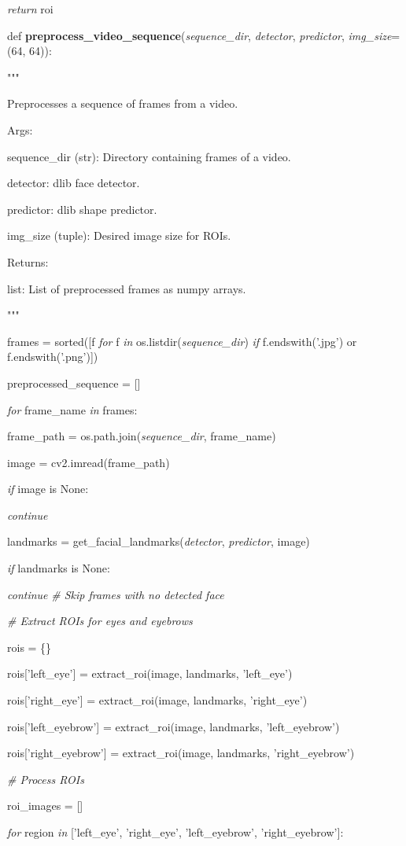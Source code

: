 \documentclass[
]{article}
\begin{document}
\emph{return} roi

def \textbf{preprocess\_video\_sequence}(\emph{sequence\_dir}, \emph{detector}, \emph{predictor}, \emph{img\_size}=(64, 64)):

"""

Preprocesses a sequence of frames from a video.

Args:

sequence\_dir (str): Directory containing frames of a video.

detector: dlib face detector.

predictor: dlib shape predictor.

img\_size (tuple): Desired image size for ROIs.

Returns:

list: List of preprocessed frames as numpy arrays.

"""

frames = sorted({[}f \emph{for} f \emph{in} os.listdir(\emph{sequence\_dir}) \emph{if} f.endswith('.jpg') or f.endswith('.png'){]})

preprocessed\_sequence = {[}{]}

\emph{for} frame\_name \emph{in} frames:

frame\_path = os.path.join(\emph{sequence\_dir}, frame\_name)

image = cv2.imread(frame\_path)

\emph{if} image is None:

\emph{continue}

landmarks = get\_facial\_landmarks(\emph{detector}, \emph{predictor}, image)

\emph{if} landmarks is None:

\emph{continue} \emph{\# Skip frames with no detected face}

\emph{\# Extract ROIs for eyes and eyebrows}

rois = \{\}

rois{[}'left\_eye'{]} = extract\_roi(image, landmarks, 'left\_eye')

rois{[}'right\_eye'{]} = extract\_roi(image, landmarks, 'right\_eye')

rois{[}'left\_eyebrow'{]} = extract\_roi(image, landmarks, 'left\_eyebrow')

rois{[}'right\_eyebrow'{]} = extract\_roi(image, landmarks, 'right\_eyebrow')

\emph{\# Process ROIs}

roi\_images = {[}{]}

\emph{for} region \emph{in} {[}'left\_eye', 'right\_eye', 'left\_eyebrow', 'right\_eyebrow'{]}:
\end{document}
